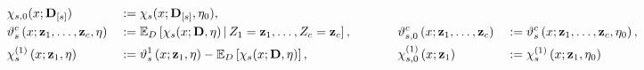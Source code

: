 \begin{alignat}{4}
    &\chi_{s, 0}(x; \mathbf{D}_{[s]})
    & \; := \; &\chi_{s}(x; \mathbf{D}_{[s]}, \eta_{0}),\\
    &\vartheta_{s}^{c}\left(x; \mathbf{z}_{1}, \dotsc, \mathbf{z}_{c}, \eta\right)
    & \; := \; &\mathbb{E}_{D}\left[\chi_{s}(x; \mathbf{D}, \eta) \, \middle| \, Z_1 = \mathbf{z}_1, \dotsc, Z_c = \mathbf{z}_c\right], &
    \hspace{1cm}
    &\vartheta_{s,0}^{c}\left(x; \mathbf{z}_{1}, \dotsc, \mathbf{z}_{c}\right)
    & \; := \; &\vartheta_{s}^{c}\left(x; \mathbf{z}_{1}, \dotsc, \mathbf{z}_{c}, \eta_{0}\right), \\
    &\chi_{s}^{(1)}\left(x; \mathbf{z}_{1}, \eta\right)
	& \; := \; &\vartheta_{s}^{1}\left(x; \mathbf{z}_{1}, \eta\right)
    - \mathbb{E}_{D}\left[\chi_{s}(x; \mathbf{D}, \eta)\right], &
    \hspace{1cm}
    &\chi_{s,0}^{(1)}\left(x; \mathbf{z}_{1}\right)
	& \; := \; &\chi_{s}^{(1)}\left(x; \mathbf{z}_{1}, \eta_{0}\right)
\end{alignat}
